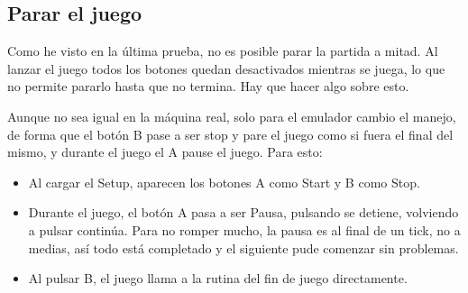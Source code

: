 \subsection{Parar el juego}
\label{sec:F5I7Parar}
Como he visto en la última prueba, no es posible parar la partida a mitad. 
Al lanzar el juego todos los botones quedan desactivados mientras se juega, 
lo que no permite pararlo hasta que no termina. Hay que hacer algo sobre esto. 

Aunque no sea igual en la máquina real, solo para el emulador cambio el manejo, 
de forma que el botón B pase a ser stop y pare el juego como si fuera el
final del mismo, y durante el juego el A pause el juego. Para esto:

\begin{itemize}
	\item Al cargar el Setup, aparecen los botones A como Start y B como Stop. 
 
	\item Durante el juego, el botón A pasa a ser Pausa, pulsando se detiene, volviendo 
	a pulsar continúa. Para no romper mucho, la pausa es al final de un tick, no a 
	medias, así todo está completado y el siguiente pude comenzar sin problemas.
	
	\item Al pulsar B, el juego llama a la rutina del fin de juego directamente.
	
\end{itemize}